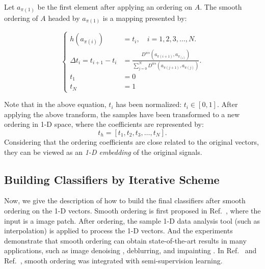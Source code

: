 \documentclass{ws-ijwmip}
\begin{document}
%

Let $a_{\pi(1)}$ be the first element after applying an ordering on $A$. 
The smooth ordering of $A$ headed by $a_{\pi(1)}$ is a mapping presented by: 

\begin{equation}
\left\{
\begin{aligned}
h(a_{\pi(i)}) &= t_i,  \quad i=1,2,3,\dots,N. \\
\Delta t_i = t_{i+1} - t_i & = \frac{D^{ws}(a_{\pi(i+1)},a_{\pi_{(i)}})}{\sum _{j=0}^{N}D^{ws}(a_{\pi(j+1)},a_{\pi(j)})}.\\
t_1 & =0\\
t_N & =1
\end{aligned}
\right.
\end{equation}

%

Note that in the above equation, $t_i$ has been normalized: $t_i\in [0, 1]$. 
After applying the above transform, the samples have been transformed to a new ordering in 1-D space, where the coefficients are represented by:
\begin{equation}
t_h = [t_1,t_2,t_3,\dots,t_N].
 \label{equ2.16}
\end{equation}
Considering that the ordering coefficients are close related to the original vectors, they can be viewed as an \emph{1-D embedding} of the original signals.


\subsection{Building Classifiers by Iterative Scheme}
Now, we give the description of how to build the final classifiers after smooth ordering on the 1-D vectors. 
Smooth ordering is first proposed in Ref.~, 
where the input is a image patch.
After ordering, the sample 1-D data analysis tool (such as interpolation) is applied to process the 1-D vectors. 
And the experiments demonstrate that smooth ordering can obtain state-of-the-art results in many applications, such as image denoising \cite{32,33}, deblurring, and impainting \cite{30}. In Ref.~ and Ref.~, smooth ordering was integrated with semi-supervision learning.
\end{document}
